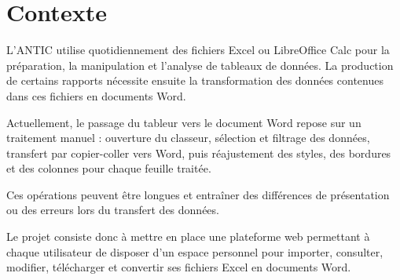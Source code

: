 \chapter{Contexte}

L'ANTIC utilise quotidiennement des fichiers Excel ou LibreOffice Calc pour la préparation, la manipulation et l'analyse de tableaux de données. La production de certains rapports nécessite ensuite la transformation des données contenues dans ces fichiers en documents Word.

Actuellement, le passage du tableur vers le document Word repose sur un traitement manuel : ouverture du classeur, sélection et filtrage des données, transfert par copier-coller vers Word, puis réajustement des styles, des bordures et des colonnes pour chaque feuille traitée.

Ces opérations peuvent être longues et entraîner des différences de présentation ou des erreurs lors du transfert des données.

Le projet consiste donc à mettre en place une plateforme web permettant à chaque utilisateur de disposer d'un espace personnel pour importer, consulter, modifier, télécharger et convertir ses fichiers Excel en documents Word.
